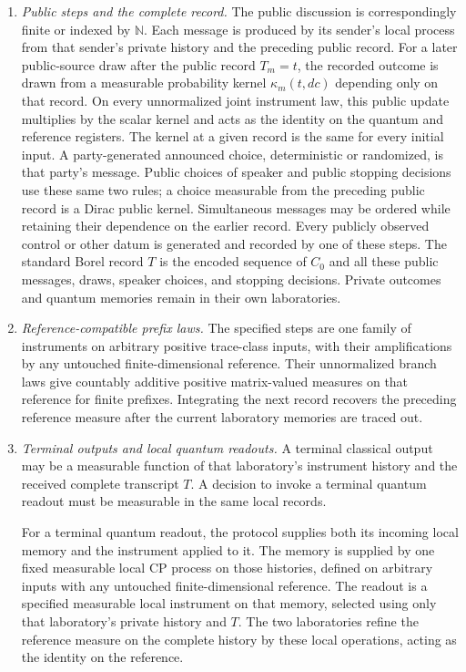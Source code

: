 \begin{definition}
\begin{enumerate}
\item\label{protocol:public} \textit{Public steps and the complete record.}
The public discussion is correspondingly finite or indexed by $\mathbb N$.
Each message is produced by its sender's local process from that sender's
private history and the preceding public record.  For a later public-source
draw after the public record $T_m=t$, the recorded outcome is drawn from a
measurable probability kernel $\kappa_m(t,dc)$ depending only on that record.
On every unnormalized joint instrument law, this public update multiplies
by the scalar kernel and acts as the identity on the quantum and reference
registers.  The kernel at a given record is the same for every initial input.
A party-generated announced choice, deterministic or randomized, is that
party's message.  Public choices of speaker and public stopping decisions
use these same two rules; a choice measurable from the preceding public
record is a Dirac public kernel.  Simultaneous messages may be ordered while
retaining their dependence on the earlier record.  Every publicly observed
control or other datum is generated and recorded by one of these steps.
The standard Borel record $T$ is the encoded sequence of $C_0$ and all
these public messages, draws, speaker choices, and stopping decisions.
Private outcomes and quantum
memories remain in their own laboratories.

\item\label{protocol:reference} \textit{Reference-compatible prefix laws.}
The specified steps are one family of instruments on arbitrary positive
trace-class inputs, with their amplifications by any untouched
finite-dimensional reference.  Their unnormalized branch laws give
countably additive positive matrix-valued measures on that reference for
finite prefixes.  Integrating the next record recovers the preceding
reference measure after the current laboratory memories are traced out.

\item\label{protocol:terminal} \textit{Terminal outputs and local quantum readouts.}
A terminal classical output may be a measurable function of that
laboratory's instrument history and the received complete transcript $T$.
A decision to invoke a terminal quantum readout must be measurable in
the same local records.

For a terminal quantum readout, the protocol supplies both its incoming
local memory and the instrument applied to it.  The memory is supplied by
one fixed measurable local CP process on those histories, defined on
arbitrary inputs with any untouched finite-dimensional reference.  The
readout is a specified measurable local instrument on that memory,
selected using only that laboratory's private history and $T$.
The two laboratories refine the reference measure on the complete
history by these local operations, acting as the identity on the
reference.


\end{enumerate}
\end{definition}
